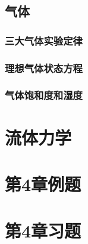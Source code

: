 \subsection{气体}
\subsubsection{三大气体实验定律}
\subsubsection{理想气体状态方程}
\subsubsection{气体饱和度和湿度}

\section{流体力学} 

\section{第4章例题}
\section{第4章习题}
